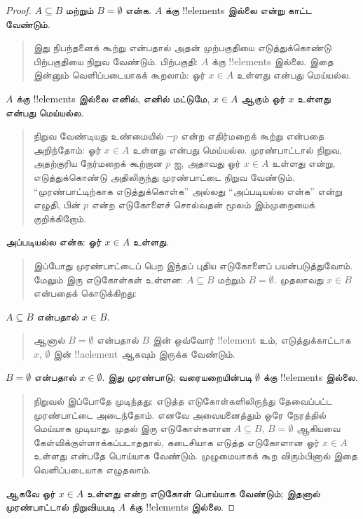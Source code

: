 \documentclass[../../../include/open-logic-section]{subfiles}
\begin{document}
\begin{proof}
  $A \subseteq B$ மற்றும் $B = \emptyset$ என்க.
  $A$ க்கு !!{element}s இல்லை என்று காட்ட வேண்டும்.
  \begin{quote}
    இது நிபந்தனைக் கூற்று என்பதால் அதன் முற்பகுதியை
    எடுத்துக்கொண்டு பிற்பகுதியை நிறுவ வேண்டும்.
    பிற்பகுதி: $A$ க்கு !!{element}s இல்லை.
    இதை இன்னும் வெளிப்படையாகக் கூறலாம்:
    ஓர் $x \in A$ உள்ளது என்பது மெய்யல்ல.
  \end{quote}
  $A$ க்கு !!{element}s இல்லை எனில், எனில் மட்டுமே,
  $x \in A$ ஆகும் ஓர் $x$ உள்ளது என்பது மெய்யல்ல.
  \begin{quote}
    நிறுவ வேண்டியது உண்மையில் $\lnot p$ என்ற
    எதிர்மறைக் கூற்று என்பதை அறிந்தோம்: ஓர் $x \in A$
    உள்ளது என்பது மெய்யல்ல. முரண்பாட்டால் நிறுவ,
    அதற்குரிய நேர்மறைக் கூற்றான $p$ ஐ, அதாவது
    ஓர் $x \in A$ உள்ளது என்று, எடுத்துக்கொண்டு
    அதிலிருந்து முரண்பாட்டை நிறுவ வேண்டும்.
    ``முரண்பாட்டிற்காக எடுத்துக்கொள்க'' அல்லது
    ``அப்படியல்ல என்க'' என்று எழுதி, பின் $p$
    என்ற எடுகோளைச் சொல்வதன் மூலம் இம்முறையைக்
    குறிக்கிறோம்.
  \end{quote}
  அப்படியல்ல என்க: ஓர் $x \in A$ உள்ளது.
  \begin{quote}
    இப்போது முரண்பாட்டைப் பெற இந்தப் புதிய எடுகோளைப்
    பயன்படுத்துவோம். மேலும் இரு எடுகோள்கள் உள்ளன:
    $A \subseteq B$ மற்றும் $B = \emptyset$.
    முதலாவது $x \in B$ என்பதைக் கொடுக்கிறது:
  \end{quote}
  $A \subseteq B$ என்பதால் $x \in B$.
  \begin{quote}
    ஆனால் $B = \emptyset$ என்பதால் $B$ இன்
    ஒவ்வோர் !!{element} உம், எடுத்துக்காட்டாக $x$,
    $\emptyset$ இன் !!a{element} ஆகவும் இருக்க வேண்டும்.
  \end{quote}
  $B = \emptyset$ என்பதால் $x \in \emptyset$.
  இது முரண்பாடு; வரையறையின்படி $\emptyset$ க்கு
  !!{element}s இல்லை.
  \begin{quote}
    நிறுவல் இப்போதே முடிந்தது: எடுத்த எடுகோள்களிலிருந்து
    தேவைப்பட்ட முரண்பாட்டை அடைந்தோம். எனவே அவையனைத்தும்
    ஒரே நேரத்தில் மெய்யாக முடியாது. முதல் இரு எடுகோள்களான
    $A \subseteq B$, $B = \emptyset$ ஆகியவை
    கேள்விக்குள்ளாக்கப்படாததால், கடைசியாக எடுத்த
    எடுகோளான ஓர் $x \in A$ உள்ளது என்பதே பொய்யாக
    வேண்டும். முழுமையாகக் கூற விரும்பினால் இதை
    வெளிப்படையாக எழுதலாம்.
  \end{quote}
  ஆகவே ஓர் $x \in A$ உள்ளது என்ற எடுகோள்
  பொய்யாக வேண்டும்; இதனால் முரண்பாட்டால் நிறுவியபடி
  $A$ க்கு !!{element}s இல்லை.
\end{proof}
\end{document}
